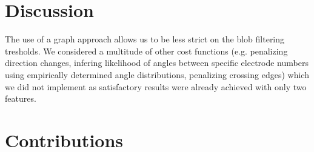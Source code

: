 \documentclass[a4paper, 11pt]{article}
\begin{document}
\section{Discussion}
The use of a graph approach allows us to be less strict on the blob filtering tresholds. We considered a multitude of other cost functions (e.g. penalizing direction changes, infering likelihood of angles between specific electrode numbers using empirically determined angle distributions, penalizing crossing edges) which we did not implement as satisfactory results were already achieved with only two features.

\section{Contributions}



\end{document}
